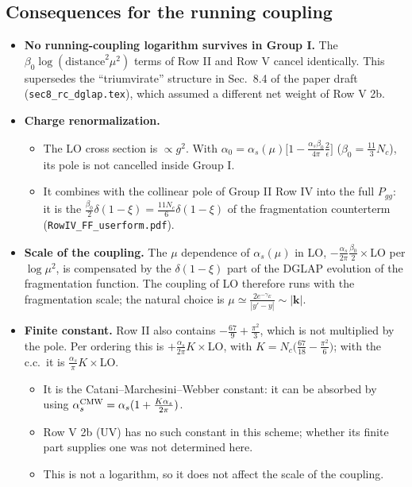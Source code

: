 \documentclass[10pt]{article}
\numberwithin{equation}{section}
\begin{document}
\subsection{Consequences for the running coupling}
\begin{itemize}
\item \textbf{No running-coupling logarithm survives in Group I.} The $\beta_0\log(\text{distance}^2\mu^2)$ terms of Row II and Row V cancel identically. This supersedes the ``triumvirate'' structure in Sec.~8.4 of the paper draft (\texttt{sec8\_rc\_dglap.tex}), which assumed a different net weight of Row V 2b.
\item \textbf{Charge renormalization.}
\begin{itemize}
\item The LO cross section is $\propto g^2$. With $\alpha_0=\alpha_s(\mu)\big[1-\frac{\alpha_s\beta_0}{4\pi}\frac{2}{\epsilon}\big]$ ($\beta_0=\frac{11}{3}N_c$), its pole is not cancelled inside Group I.
\item It combines with the collinear pole of Group II Row IV into the full $P_{gg}$: it is the $\frac{\beta_0}{2}\delta(1-\xi)=\frac{11N_c}{6}\delta(1-\xi)$ of the fragmentation counterterm (\texttt{RowIV\_FF\_userform.pdf}).
\end{itemize}
\item \textbf{Scale of the coupling.} The $\mu$ dependence of $\alpha_s(\mu)$ in LO, $-\frac{\alpha_s}{2\pi}\frac{\beta_0}{2}\times$LO per $\log\mu^2$, is compensated by the $\delta(1-\xi)$ part of the DGLAP evolution of the fragmentation function. The coupling of LO therefore runs with the fragmentation scale; the natural choice is $\mu\simeq\frac{2e^{-\gamma_E}}{|y'-y|}\sim|\mathbf k|$.
\item \textbf{Finite constant.} Row II also contains $-\frac{67}{9}+\frac{\pi^2}{3}$, which is not multiplied by the pole. Per ordering this is $+\frac{\alpha_s}{2\pi}K\times$LO, with $K=N_c\big(\frac{67}{18}-\frac{\pi^2}{6}\big)$; with the c.c.\ it is $\frac{\alpha_s}{\pi}K\times$LO.
\begin{itemize}
\item It is the Catani--Marchesini--Webber constant: it can be absorbed by using $\alpha_s^{\rm CMW}=\alpha_s(1+\frac{K\alpha_s}{2\pi})$.
\item Row V 2b (UV) has no such constant in this scheme; whether its finite part supplies one was not determined here.
\item This is not a logarithm, so it does not affect the scale of the coupling.
\end{itemize}
\end{itemize}
\end{document}
